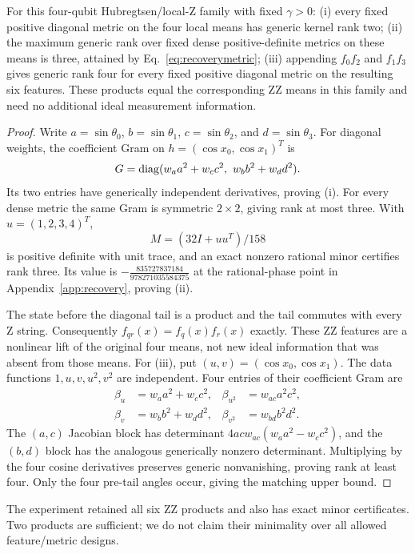\begin{proposition}
\label{prop:recoveryboundary}
For this four-qubit Hubregtsen/local-Z family with fixed
$\gamma>0$: (i) every fixed positive diagonal metric on the four
local means has generic kernel rank two; (ii) the maximum generic
rank over fixed dense positive-definite metrics on these means is
three, attained by Eq.~\eqref{eq:recoverymetric}; (iii) appending
$f_0f_2$ and $f_1f_3$ gives generic rank four for every fixed positive
diagonal metric on the resulting six features. These products equal
the corresponding ZZ means in this family and need no additional
ideal measurement information.
\end{proposition}
\begin{proof}
Write $a=\sin\theta_0$, $b=\sin\theta_1$,
$c=\sin\theta_2$, and $d=\sin\theta_3$. For diagonal weights, the coefficient
Gram on $h=(\cos x_0,\cos x_1)^T$ is
\[
 G=\operatorname{diag}(w_a a^2+w_c c^2,\ w_b b^2+w_d d^2).
\]
Its two entries have generically independent derivatives, proving (i).
For every dense metric the same Gram is symmetric $2\times2$, giving
rank at most three. With $u=(1,2,3,4)^T$,
\begin{equation}
 M=(32I+uu^T)/158\label{eq:recoverymetric}
\end{equation}
is positive definite with unit trace, and an exact nonzero rational
minor certifies rank three. Its value is
$-\frac{835727837184}{978271035584375}$ at the rational-phase point in
Appendix~\ref{app:recovery}, proving (ii).

The state before the diagonal tail is a product and the tail commutes
with every Z string. Consequently $f_{qr}(x)=f_q(x)f_r(x)$ exactly.
These ZZ features are a nonlinear lift of the original four means,
not new ideal information that was absent from those means.
For (iii), put $(u,v)=(\cos x_0,\cos x_1)$.
The data functions $1,u,v,u^2,v^2$ are independent. Four entries of
their coefficient Gram are
\begin{equation}
 \begin{aligned}
 \beta_u&=w_a a^2+w_c c^2,&\beta_{u^2}&=w_{ac}a^2c^2,\\
 \beta_v&=w_b b^2+w_d d^2,&\beta_{v^2}&=w_{bd}b^2d^2.
 \end{aligned}\label{eq:twoproductrecovery}
\end{equation}
The $(a,c)$ Jacobian block has determinant
$4acw_{ac}(w_a a^2-w_c c^2)$, and the $(b,d)$ block has the
analogous generically nonzero determinant. Multiplying by the four
cosine derivatives preserves generic nonvanishing, proving rank at
least four. Only the four pre-tail angles occur, giving the matching
upper bound.
\end{proof}
The experiment retained all six ZZ products and also
has exact minor certificates. Two products are sufficient; we do not
claim their minimality over all allowed feature/metric designs.

